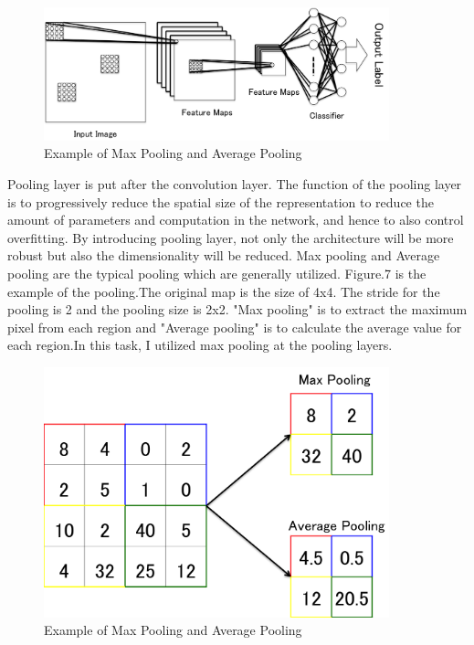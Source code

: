 \documentclass[a4paper,10pt,fleqn]{article}
\begin{document}
\begin{figure}[htbp]

	\begin{center}
	\includegraphics[width=10cm]{picture/Structure_of_convolution.png}
	\caption{Example of Max Pooling and Average Pooling}
	\end{center}
	\label{fig:six}

\end{figure}











Pooling layer is put after the convolution layer. %
The function of the pooling layer is to progressively reduce the spatial size of the representation to reduce the amount of parameters and computation in the network, and hence to also control overfitting.
By introducing pooling layer, not only the architecture will be more robust but also the dimensionality will be reduced. Max pooling and Average pooling are the typical pooling which are generally utilized. Figure.7 is the example of the pooling.The original map is the size of 4x4. The stride for the pooling is 2 and the pooling size is 2x2. "Max pooling" is to extract the maximum pixel from each region and "Average pooling" is to calculate the average value for each region.In this task, I utilized max pooling at the pooling layers.

\begin{figure}[htbp]

	\begin{center}
	\includegraphics[width=10cm]{picture/Pooling.png}
	\caption{Example of Max Pooling and Average Pooling}
	\end{center}
	\label{fig:seven}

\end{figure}
\end{document}
